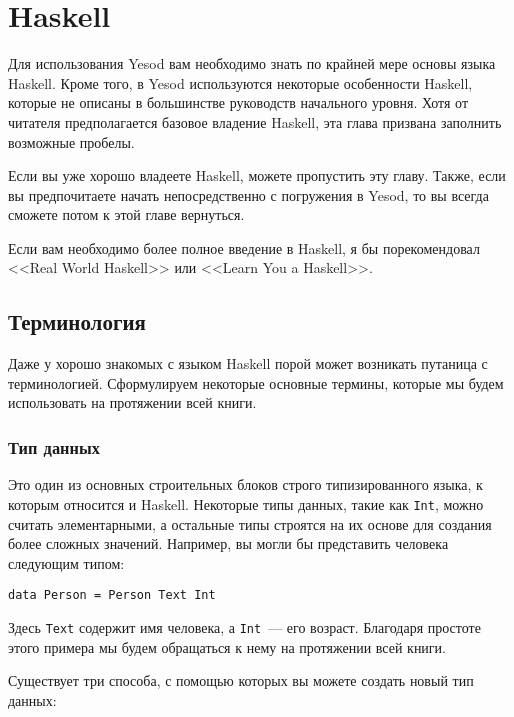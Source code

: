 \chapter{Haskell}

Для использования Yesod вам необходимо знать по крайней мере основы языка Haskell. Кроме того, в Yesod используются некоторые особенности Haskell, которые не описаны в большинстве руководств начального уровня. Хотя от читателя предполагается базовое владение Haskell, эта глава призвана заполнить возможные пробелы.

Если вы уже хорошо владеете Haskell, можете пропустить эту главу. Также, если вы предпочитаете начать непосредственно с погружения в Yesod, то вы всегда сможете потом к этой главе вернуться.

Если вам необходимо более полное введение в Haskell, я бы порекомендовал <<Real World Haskell>> или <<Learn You a Haskell>>.

\section{Терминология}

Даже у хорошо знакомых с языком Haskell порой может возникать путаница с терминологией. Сформулируем некоторые основные термины, которые мы будем использовать на протяжении всей книги.

\subsection{Тип данных}

Это один из основных строительных блоков строго типизированного языка, к которым относится и Haskell. Некоторые типы данных, такие как \lstinline'Int', можно считать элементарными, а остальные типы строятся на их основе для создания более сложных значений. Например, вы могли бы представить человека следующим типом:

\begin{lstlisting}
data Person = Person Text Int
\end{lstlisting}

Здесь \lstinline'Text' содержит имя человека, а \lstinline'Int'~--- его возраст. Благодаря простоте этого примера мы будем обращаться к нему на протяжении всей книги.

Существует три способа, с помощью которых вы можете создать новый тип данных:

